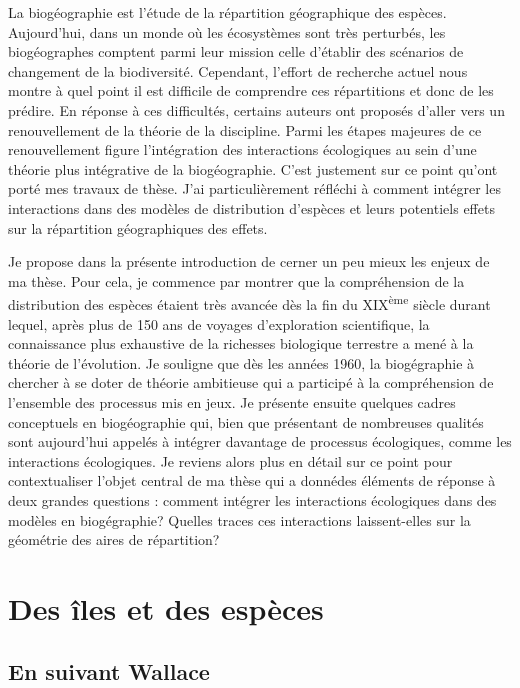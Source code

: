 La biogéographie est l'étude de la répartition géographique des espèces.
Aujourd'hui, dans un monde où les écosystèmes sont très perturbés, les
biogéographes comptent parmi leur mission celle d'établir des scénarios
de changement de la biodiversité. Cependant, l'effort de recherche
actuel nous montre à quel point il est difficile de comprendre ces
répartitions et donc de les prédire. En réponse à ces difficultés,
certains auteurs ont proposés d'aller vers un renouvellement de la
théorie de la discipline. Parmi les étapes majeures de ce renouvellement
figure l'intégration des interactions écologiques au sein d'une théorie
plus intégrative de la biogéographie. C'est justement sur ce point
qu'ont porté mes travaux de thèse. J'ai particulièrement réfléchi à
comment intégrer les interactions dans des modèles de distribution
d'espèces et leurs potentiels effets sur la répartition géographiques
des effets.

Je propose dans la présente introduction de cerner un peu mieux les
enjeux de ma thèse. Pour cela, je commence par montrer que la
compréhension de la distribution des espèces étaient très avancée dès la
fin du XIX\textsuperscript{ème} siècle durant lequel, après plus de 150
ans de voyages d'exploration scientifique, la connaissance plus
exhaustive de la richesses biologique terrestre a mené à la théorie de
l'évolution. Je souligne que dès les années 1960, la biogégraphie à
chercher à se doter de théorie ambitieuse qui a participé à la
compréhension de l'ensemble des processus mis en jeux. Je présente
ensuite quelques cadres conceptuels en biogéographie qui, bien que
présentant de nombreuses qualités sont aujourd'hui appelés à intégrer
davantage de processus écologiques, comme les interactions écologiques.
Je reviens alors plus en détail sur ce point pour contextualiser l'objet
central de ma thèse qui a donnédes éléments de réponse à deux grandes
questions : comment intégrer les interactions écologiques dans des
modèles en biogégraphie? Quelles traces ces interactions laissent-elles
sur la géométrie des aires de répartition?

\section*{Des îles et des espèces}\label{des-uxeeles-et-des-espuxe8ces}

\subsection*{En suivant Wallace}\label{en-suivant-wallace}

